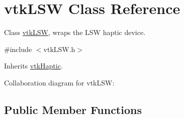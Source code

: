 \hypertarget{classvtkLSW}{
\section{vtkLSW Class Reference}
\label{classvtkLSW}
}


Class \hyperlink{classvtkLSW}{vtkLSW}, wraps the LSW haptic device.  




{\ttfamily \#include $<$vtkLSW.h$>$}



Inherits \hyperlink{classvtkHaptic}{vtkHaptic}.



Collaboration diagram for vtkLSW:\subsection*{Public Member Functions}
